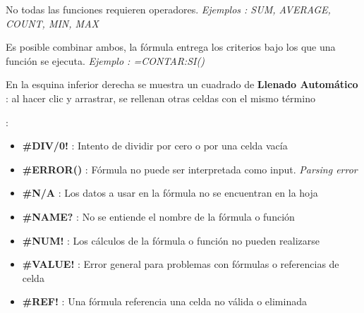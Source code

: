 \begin{description}
{\begin{description}
        \item {No todas las funciones requieren operadores. \textit{Ejemplos : SUM, AVERAGE, COUNT, MIN, MAX}}
        \item {Es posible combinar ambos, la fórmula entrega los criterios bajo los que una función se ejecuta. \textit{Ejemplo : =CONTAR:SI()}}
        \item {En la esquina inferior derecha se muestra un cuadrado de \textbf{Llenado Automático} : al hacer clic y arrastrar, se rellenan otras celdas con el mismo término}
        \item[Errores Comunes]{ : 
        \begin{itemize}
            \item {\textbf{\#DIV/0!} : Intento de dividir por cero o por una celda vacía}
            \item {\textbf{\#ERROR()} : Fórmula no puede ser interpretada como input. \textit{Parsing error}}
            \item {\textbf{\#N/A} : Los datos a usar en la fórmula no se encuentran en la hoja}
            \item {\textbf{\#NAME?} : No se entiende el nombre de la fórmula o función}
            \item {\textbf{\#NUM!} : Los cálculos de la fórmula o función no pueden realizarse}
            \item {\textbf{\#VALUE!} : Error general para problemas con fórmulas o referencias de celda}
            \item {\textbf{\#REF!} : Una fórmula referencia una celda no válida o eliminada}
        \end{itemize}} 
    \end{description}}
\end{description}



